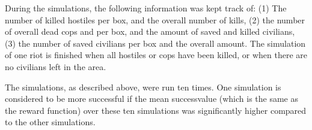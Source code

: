 During the simulations, the following information was kept track of: (1) The number of killed hostiles per box, and the overall number of kills, (2) the number of overall dead cops and per box, and the amount of saved and killed civilians, (3) the number of saved civilians per box and the overall amount. The simulation of one riot is finished when all hostiles or cops have been killed, or when there are no civilians left in the area.
 
The simulations, as described above, were run ten times. One simulation is considered to be more successful if the mean successvalue (which is the same as the reward function) over these ten simulations was significantly higher compared to the other simulations. 
